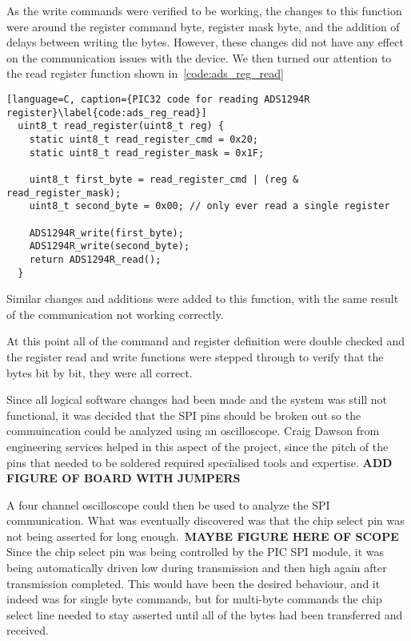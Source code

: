 As the write commands were verified to be working, the changes to this function were around the register command byte,
register mask byte, and the addition of delays between writing the bytes.
However, these changes did not have any effect on the communication issues with the device.
We then turned our attention to the read register function shown in~\autoref{code:ads_reg_read}

\begin{lstlisting}[language=C, caption={PIC32 code for reading ADS1294R register}\label{code:ads_reg_read}]
  uint8_t read_register(uint8_t reg) {
    static uint8_t read_register_cmd = 0x20;
    static uint8_t read_register_mask = 0x1F;

    uint8_t first_byte = read_register_cmd | (reg & read_register_mask);
    uint8_t second_byte = 0x00; // only ever read a single register

    ADS1294R_write(first_byte);
    ADS1294R_write(second_byte);
    return ADS1294R_read();
  }
\end{lstlisting}

Similar changes and additions were added to this function, with the same result of the communication not working correctly.

At this point all of the command and register definition were double checked and
the register read and write functions were stepped through to verify that the bytes bit by bit, they were all correct.

Since all logical software changes had been made and the system was still not functional,
it was decided that the SPI pins should be broken out so the commuincation could be analyzed using an oscilloscope.
Craig Dawson from engineering services helped in this aspect of the project,
since the pitch of the pins that needed to be soldered required specialised tools and expertise.
\textbf{ADD FIGURE OF BOARD WITH JUMPERS}

A four channel oscilloscope could then be used to analyze the SPI communication.
What was eventually discovered was that the chip select pin was not being asserted for long enough.~\textbf{MAYBE FIGURE HERE OF SCOPE}
Since the chip select pin was being controlled by the PIC SPI module,
it was being automatically driven low during transmission and then high again after transmission completed.
This would have been the desired behaviour, and it indeed was for single byte commands,
but for multi-byte commands the chip select line needed to stay asserted until all of the bytes had been transferred and received.

